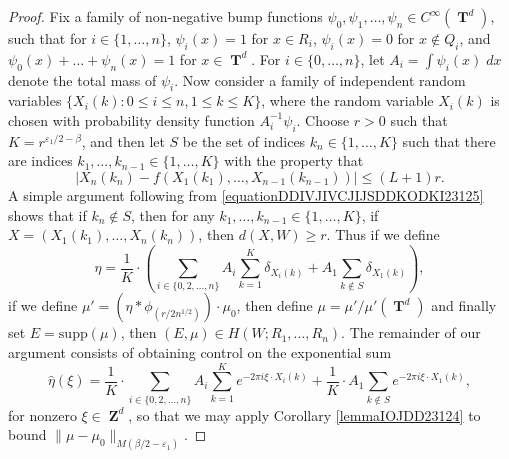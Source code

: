 \documentclass[12pt,reqno]{article}
\numberwithin{equation}{section}
\DeclareMathOperator{\ZZ}{\mathbf{Z}}
\DeclareMathOperator{\TT}{\mathbf{T}}
\numberwithin{theorem}{section}
\begin{document}
\begin{proof}
    Fix a family of non-negative bump functions $\psi_0,\psi_1,\dots,\psi_n \in C^\infty(\TT^d)$, such that for $i \in \{ 1,\dots,n \}$, $\psi_i(x) = 1$ for $x \in R_i$, $\psi_i(x) = 0$ for $x \not \in Q_i$, and $\psi_0(x) + \dots + \psi_n(x) = 1$ for $x \in \TT^d$. For $i \in \{ 0, \dots, n \}$, let $A_i = \int \psi_i(x)\; dx$ denote the total mass of $\psi_i$. Now consider a family of independent random variables $\{ X_i(k) : 0 \leq i \leq n, 1 \leq k \leq K \}$, where the random variable $X_i(k)$ is chosen with probability density function $A_i^{-1} \psi_i$. Choose $r > 0$ such that $K = r^{\varepsilon_1/2-\beta}$,
    and then let $S$ be the set of indices $k_n \in \{ 1, \dots, K \}$ such that there are indices $k_1,\dots,k_{n-1} \in \{ 1,\dots,K \}$ with the property that
    \begin{equation} \label{equationDDIVJIVCJIJSDDKODKI23125}
        |X_n(k_n) - f(X_1(k_1),\dots,X_{n-1}(k_{n-1}))| \leq (L+1)r.
    \end{equation}
    A simple argument following from \eqref{equationDDIVJIVCJIJSDDKODKI23125} shows that if $k_n \not \in S$, then for any $k_1,\dots,k_{n-1} \in \{ 1, \dots, K \}$, if $X = (X_1(k_1),\dots,X_n(k_n))$, then $d(X,W) \geq r$. Thus if we define
    \[ \eta = \frac{1}{K} \cdot \left( \sum_{i \in \{ 0, 2, \dots, n \}} A_i \sum_{k = 1}^K \delta_{X_i(k)} + A_1 \sum_{k \not \in S} \delta_{X_1(k)} \right), \]
    if we define $\mu' = (\eta * \phi_{(r/2n^{1/2})}) \cdot \mu_0$, then define $\mu = \mu'/\mu'(\TT^d)$ and finally set $E = \text{supp}(\mu)$, then $(E,\mu) \in H(W;R_1,\dots,R_n)$. The remainder of our argument consists of obtaining control on the exponential sum
    \begin{equation} \label{equationIODJOIVJIO}
        \widehat{\eta}(\xi) = \frac{1}{K} \cdot \sum_{i \in \{ 0, 2, \dots, n \}} A_i \sum_{k = 1}^K e^{-2 \pi i \xi \cdot X_i(k)} + \frac{1}{K} \cdot A_1 \sum_{k \not \in S} e^{-2 \pi i \xi \cdot X_1(k)},
    \end{equation}
    for nonzero $\xi \in \ZZ^d$, so that we may apply Corollary \ref{lemmaIOJDD23124} to bound $\| \mu - \mu_0 \|_{M(\beta/2-\varepsilon_1)}$.


\end{proof}
\end{document}
